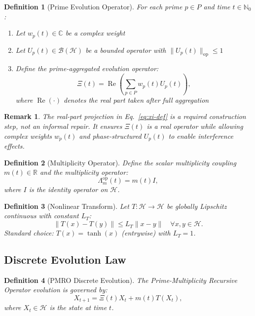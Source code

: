 \documentclass[11pt,a4paper]{article}
\newtheorem{definition}{Definition}
\newtheorem{remark}{Remark}
\begin{document}
\begin{definition}[Prime Evolution Operator]
For each prime \(p \in P\) and time \(t \in \mathbb{N}_0\):
\begin{enumerate}
\item Let \(w_p(t) \in \mathbb{C}\) be a complex weight
\item Let \(U_p(t) \in \mathcal{B}(\mathcal{H})\) be a bounded operator with \(\|U_p(t)\|_{\mathrm{op}} \leq 1\)
\item Define the \emph{prime-aggregated evolution operator}:
\begin{equation}
\Xi(t) = \operatorname{Re}\left( \sum_{p \in P} w_p(t) U_p(t) \right),
\label{eq:xi-def}
\end{equation}
where \(\operatorname{Re}(\cdot)\) denotes the real part taken \emph{after} full aggregation
\end{enumerate}
\end{definition}

\begin{remark}
The real-part projection in Eq.~\eqref{eq:xi-def} is a required construction step, not an informal repair. It ensures \(\Xi(t)\) is a real operator while allowing complex weights \(w_p(t)\) and phase-structured \(U_p(t)\) to enable interference effects.
\end{remark}

\begin{definition}[Multiplicity Operator]
Define the scalar multiplicity coupling \(m(t) \in \mathbb{R}\) and the multiplicity operator:
\[
\Lambda_m^{\mathrm{op}}(t) = m(t) I,
\]
where \(I\) is the identity operator on \(\mathcal{H}\).
\end{definition}

\begin{definition}[Nonlinear Transform]
Let \(T: \mathcal{H} \to \mathcal{H}\) be globally Lipschitz continuous with constant \(L_T\):
\[
\|T(x) - T(y)\| \leq L_T \|x - y\| \quad \forall x, y \in \mathcal{H}.
\]
Standard choice: \(T(x) = \tanh(x)\) (entrywise) with \(L_T = 1\).
\end{definition}

\subsection{Discrete Evolution Law}

\begin{definition}[PMRO Discrete Evolution]
The Prime-Multiplicity Recursive Operator evolution is governed by:
\begin{equation}
X_{t+1} = \Xi(t) X_t + m(t) T(X_t),
\label{eq:pmro-evolution}
\end{equation}
where \(X_t \in \mathcal{H}\) is the state at time \(t\).
\end{definition}
\end{document}
